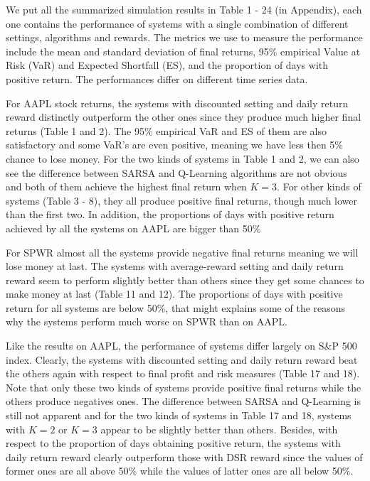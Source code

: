 \documentclass{article}
\begin{document}
\indent We put all the summarized simulation results in Table 1 - 24 (in Appendix), each one contains the performance of systems with a single combination of different settings, algorithms and rewards. The metrics we use to measure the performance include the mean and standard deviation of final returns, 95\% empirical Value at Risk (VaR) and Expected Shortfall (ES), and the proportion of days with positive return. The performances differ on different time series data.

\indent For AAPL stock returns, the systems with discounted setting and daily return reward distinctly outperform the other ones since they produce much higher final returns (Table 1 and 2). The 95\% empirical VaR and ES of them are also satisfactory and some VaR's are even positive, meaning we have less then 5\% chance to lose money. For the two kinds of systems in Table 1 and 2, we can also see the difference between SARSA and Q-Learning algorithms are not obvious and both of them achieve the highest final return when $K = 3$. For other kinds of systems (Table 3 - 8), they all produce positive final returns, though much lower than the first two. In addition, the proportions of days with positive return achieved by all the systems on AAPL are bigger than 50\%



\indent For SPWR almost all the systems provide negative final returns meaning we will lose money at last. The systems with average-reward setting and daily return reward seem to perform slightly better than others since they get some chances to make money at last (Table 11 and 12). The proportions of days with positive return for all systems are below 50\%, that might explains some of the reasons why the systems perform much worse on SPWR than on AAPL.






\indent Like the results on AAPL, the performance of systems differ largely on S\&P 500 index. Clearly, the systems with discounted setting and daily return reward beat the others again 
with respect to final profit and risk measures (Table 17 and 18). Note that only these two kinds of systems provide positive final returns while the others produce negatives ones. The difference between SARSA and Q-Learning is still not apparent and for the two kinds of systems in Table 17 and 18, systems with $K = 2$ or $K = 3$ appear to be slightly better than others. Besides, with respect to the proportion of days obtaining positive return, the systems with daily return reward clearly outperform those with DSR reward since the values of former ones are all above 50\% while the values of latter ones are all below 50\%.
\end{document}
